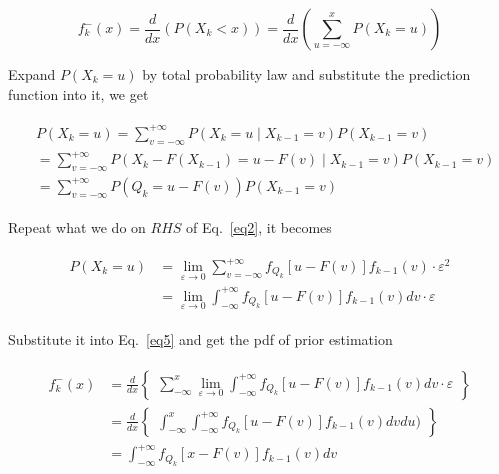 \documentclass[conference]{IEEEtran}
\begin{document}
	\begin{equation}
		f_{k}^{-}(x)=\frac{d}{dx}(P(X_{k}<x))=\frac{d}{dx}(\sum_{u=-\infty}^{x}P(X_{k}=u))
		\label{eq5}
	\end{equation}
	
	Expand $P(X_{k}=u)$ by total probability law and substitute the prediction function into it, we get
	
	\begin{equation}
	\begin{split}
	\begin{aligned}
	&P(X_{k}=u)=\sum_{v=-\infty}^{+\infty}P(X_{k}=u\mid X_{k-1}=v)P(X_{k-1}=v)\\
	&=\sum_{v=-\infty}^{+\infty}P(X_{k}-F(X_{k-1})=u-F(v)\mid X_{k-1}=v)P(X_{k-1}=v)\\
	&=\sum_{v=-\infty}^{+\infty}P(Q_{k}=u-F(v))P(X_{k-1}=v)
	\nonumber
	\end{aligned}
	\end{split}
	\end{equation}
	
	Repeat what we do on $RHS$ of Eq.~\ref{eq2}, it becomes
	
	\begin{equation}
	\begin{split}
	\begin{aligned}
	P(X_{k}=u)&=\lim_{\varepsilon \rightarrow 0 }\sum_{v=-\infty}^{+\infty}f_{Q_{k}}[u-F(v)]f_{k-1}(v)\cdot \varepsilon ^{2}\\
	&=\lim_{\varepsilon \rightarrow 0}\int_{-\infty}^{+\infty}f_{Q_{k}}[u-F(v)]f_{k-1}(v)dv \cdot \varepsilon
	\nonumber
	\end{aligned}
	\end{split}
	\end{equation}
	
	Substitute it into Eq.~\ref{eq5} and get the pdf of prior estimation
	
	\begin{equation}
	\begin{split}
	\begin{aligned}
	f_{k}^{-}(x)&=\frac{d}{dx}\begin{Bmatrix}
	{\sum_{-\infty}^{x}\lim_{\varepsilon \rightarrow 0}\int_{-\infty}^{+\infty}f_{Q_{k}}[u-F(v)]f_{k-1}(v)dv \cdot \varepsilon}
	\end{Bmatrix} \\
	&=\frac{d}{dx}\begin{Bmatrix}
	\int_{-\infty}^{x}\int_{-\infty}^{+\infty}f_{Q_{k}}[u-F(v)]f_{k-1}(v)dvdu)
	\end{Bmatrix}\\
	&=\int_{-\infty}^{+\infty}f_{Q_{k}}[x-F(v)]f_{k-1}(v)dv
	\label{eq6}
	\end{aligned}
	\end{split}
	\end{equation}
	
\end{document}
